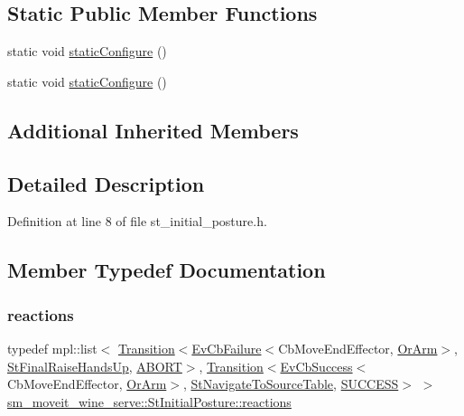 \subsection*{Static Public Member Functions}
\begin{DoxyCompactItemize}
\item 
static void \hyperlink{structsm__moveit__wine__serve_1_1StInitialPosture_a493dc8b0a4ef49b95b16781176ec4c43}{static\+Configure} ()
\item 
static void \hyperlink{structsm__moveit__wine__serve_1_1StInitialPosture_a493dc8b0a4ef49b95b16781176ec4c43}{static\+Configure} ()
\end{DoxyCompactItemize}
\subsection*{Additional Inherited Members}


\subsection{Detailed Description}


Definition at line 8 of file st\+\_\+initial\+\_\+posture.\+h.



\subsection{Member Typedef Documentation}
\mbox{\label{structsm__moveit__wine__serve_1_1StInitialPosture_a2fa5fcc86ed1b9262a87a7438b85b559}} 
\subsubsection{\texorpdfstring{reactions}{reactions}\hspace{0.1cm}{\footnotesize\ttfamily [1/2]}}
{\footnotesize\ttfamily typedef mpl\+::list$<$ \hyperlink{classsmacc_1_1Transition}{Transition}$<$\hyperlink{structsmacc_1_1EvCbFailure}{Ev\+Cb\+Failure}$<$Cb\+Move\+End\+Effector, \hyperlink{classsm__moveit__wine__serve_1_1OrArm}{Or\+Arm}$>$, \hyperlink{structsm__moveit__wine__serve_1_1StFinalRaiseHandsUp}{St\+Final\+Raise\+Hands\+Up}, \hyperlink{structsmacc_1_1default__transition__tags_1_1ABORT}{A\+B\+O\+RT}$>$, \hyperlink{classsmacc_1_1Transition}{Transition}$<$\hyperlink{structsmacc_1_1EvCbSuccess}{Ev\+Cb\+Success}$<$Cb\+Move\+End\+Effector, \hyperlink{classsm__moveit__wine__serve_1_1OrArm}{Or\+Arm}$>$, \hyperlink{structsm__moveit__wine__serve_1_1StNavigateToSourceTable}{St\+Navigate\+To\+Source\+Table}, \hyperlink{structsmacc_1_1default__transition__tags_1_1SUCCESS}{S\+U\+C\+C\+E\+SS}$>$ $>$ \hyperlink{structsm__moveit__wine__serve_1_1StInitialPosture_a2fa5fcc86ed1b9262a87a7438b85b559}{sm\+\_\+moveit\+\_\+wine\+\_\+serve\+::\+St\+Initial\+Posture\+::reactions}}



